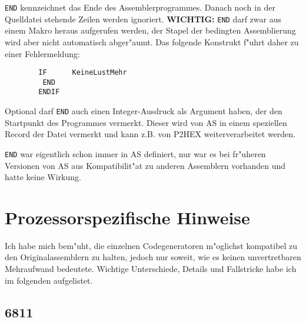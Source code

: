 \documentclass[12pt,a4paper,twoside]{report}
\newcommand{\bb}[1]{{\bf #1}}
\newcommand{\tty}[1]{{\tt #1}}
\begin{document}
\tty{END} kennzeichnet das Ende des Assemblerprogrammes.  Danach
noch in der Quelldatei stehende Zeilen werden ignoriert.
\bb{WICHTIG:} \tty{END} darf zwar aus einem Makro heraus aufgerufen
werden, der Stapel der bedingten Assemblierung wird aber nicht
automatisch abger"aumt.  Das folgende Konstrukt f"uhrt daher zu
einer Fehlermeldung:
\begin{verbatim}
        IF      KeineLustMehr
         END
        ENDIF
\end{verbatim}
Optional darf \tty{END} auch einen Integer-Ausdruck als Argument haben,
der den Startpunkt des Programmes vermerkt.  Dieser wird von AS in einem
speziellen Record der Datei vermerkt und kann z.B. von P2HEX
weiterverarbeitet werden.
\par
\tty{END} war eigentlich schon immer in AS definiert, nur war es
bei fr"uheren Versionen von AS aus Kompatibilit"at zu anderen
Assemblern vorhanden und hatte keine Wirkung.


\cleardoublepage
\chapter{Prozessorspezifische Hinweise}

Ich habe mich bem"uht, die einzelnen Codegeneratoren m"oglichst kompatibel
zu den Originalassemblern zu halten, jedoch nur soweit, wie es keinen
unvertretbaren Mehraufwand bedeutete.  Wichtige Unterschiede, Details und
Fallstricke habe ich im folgenden aufgelistet.


\section{6811}
\end{document}
